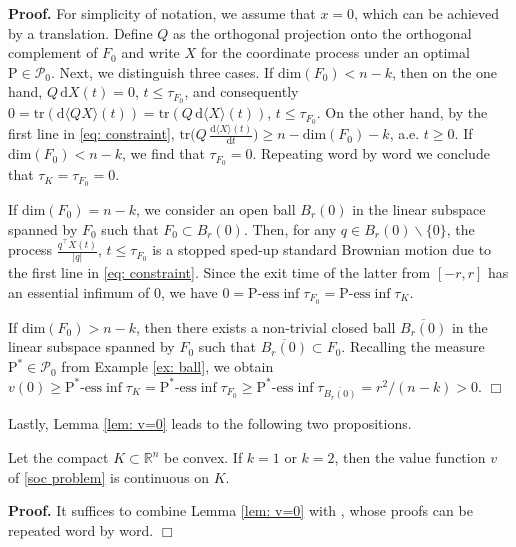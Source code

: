 \documentclass[11pt]{amsart}
\numberwithin{equation}{section}
\newcommand{\ep}{\hfill $\Box$}
\begin{document}
\noindent\textbf{Proof.} For simplicity of notation, we assume that $x=0$, which can be achieved by a translation. Define $Q$ as the orthogonal projection onto the orthogonal complement of $F_0$ and write $X$ for the coordinate process under an optimal $\mathrm{P} \in \mathcal{P}_0$. Next, we distinguish three cases. If $\text{dim}(F_0) < n-k$, then on the one hand, $Q\,\mathrm{d}X(t)=0$, $t\le\tau_{F_0}$, and consequently $0=\text{tr}(\mathrm{d}\langle QX\rangle(t))=\text{tr}(Q\,\mathrm{d}\langle X\rangle(t))$, $t\le\tau_{F_0}$. On the other hand, by the first line in \eqref{eq: constraint}, $\text{tr}\big(Q\,\frac{\mathrm{d}\langle X\rangle(t)}{\mathrm{d}t}\big)\ge n-\text{dim}(F_0)-k$, a.e. $t\ge0$. If $\text{dim}(F_0)<n-k$, we find that $\tau_{F_0}=0$. Repeating \cite[proof of Lemma 5.2]{larsson_minimum_2022} word by word we conclude that $\tau_K=\tau_{F_0}=0$.
	
\medskip
	
If $\text{dim}(F_0) = n-k$, we consider an open ball $B_r(0)$ in the linear subspace spanned by $F_0$ such that $F_0\subset B_r(0)$. Then, for any $q\in B_r(0)\backslash\{0\}$, the process $\frac{q^\top X(t)}{|q|}$, $t\le\tau_{F_0}$ is a stopped sped-up standard Brownian motion due to the first line in \eqref{eq: constraint}. Since the exit time of the latter from $[-r,r]$ has an essential infimum of $0$, we have $0=\mathrm{P}\text{-ess} \inf\tau_{F_0}=\mathrm{P}\text{-ess} \inf\tau_K$.
	
\medskip
	
If $\text{dim}(F_0)>n-k$, then there exists a non-trivial closed ball $\overline{B_r(0)}$ in the linear subspace spanned by $F_0$ such that $\overline{B_r(0)}\subset F_0$. Recalling the measure $\mathrm{P}^{\ast}\in\mathcal{P}_0$ from Example \ref{ex: ball}, we obtain $v(0)\ge \mathrm{P}^*\text{-ess} \inf\tau_K=\mathrm{P}^*\text{-ess} \inf\tau_{F_0}\ge\mathrm{P}^*\text{-ess} \inf\tau_{\overline{B_r(0)}}=r^2/(n-k)>0$. \ep

\medskip

Lastly, Lemma \ref{lem: v=0} leads to the following two propositions. 

\begin{prop}
Let the compact $K\subset\mathbb{R}^n$ be convex. If $k=1$ or $k=2$, then the value function $v$ of \eqref{soc problem} is continuous on $K$.
\end{prop}

\noindent\textbf{Proof.} It suffices to combine Lemma \ref{lem: v=0} with \cite[Lemmas 5.7 and 5.6]{larsson_minimum_2022}, whose proofs can be repeated word by word. \ep
\end{document}
